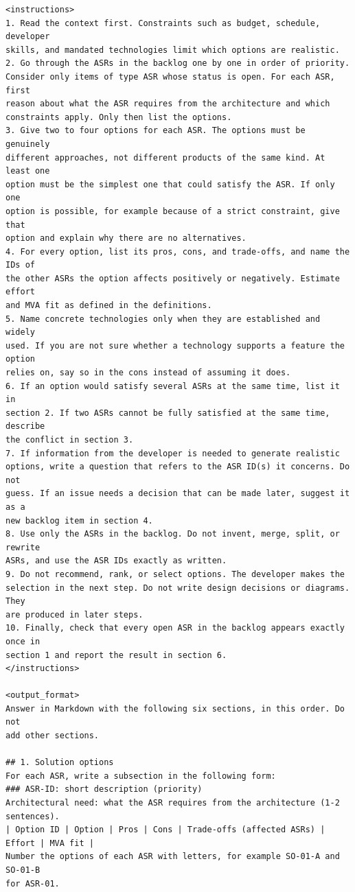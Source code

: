 \begin{lstlisting}
<instructions>
1. Read the context first. Constraints such as budget, schedule, developer
skills, and mandated technologies limit which options are realistic.
2. Go through the ASRs in the backlog one by one in order of priority.
Consider only items of type ASR whose status is open. For each ASR, first
reason about what the ASR requires from the architecture and which
constraints apply. Only then list the options.
3. Give two to four options for each ASR. The options must be genuinely
different approaches, not different products of the same kind. At least one
option must be the simplest one that could satisfy the ASR. If only one
option is possible, for example because of a strict constraint, give that
option and explain why there are no alternatives.
4. For every option, list its pros, cons, and trade-offs, and name the IDs of
the other ASRs the option affects positively or negatively. Estimate effort
and MVA fit as defined in the definitions.
5. Name concrete technologies only when they are established and widely
used. If you are not sure whether a technology supports a feature the option
relies on, say so in the cons instead of assuming it does.
6. If an option would satisfy several ASRs at the same time, list it in
section 2. If two ASRs cannot be fully satisfied at the same time, describe
the conflict in section 3.
7. If information from the developer is needed to generate realistic
options, write a question that refers to the ASR ID(s) it concerns. Do not
guess. If an issue needs a decision that can be made later, suggest it as a
new backlog item in section 4.
8. Use only the ASRs in the backlog. Do not invent, merge, split, or rewrite
ASRs, and use the ASR IDs exactly as written.
9. Do not recommend, rank, or select options. The developer makes the
selection in the next step. Do not write design decisions or diagrams. They
are produced in later steps.
10. Finally, check that every open ASR in the backlog appears exactly once in
section 1 and report the result in section 6.
</instructions>

<output_format>
Answer in Markdown with the following six sections, in this order. Do not
add other sections.

## 1. Solution options
For each ASR, write a subsection in the following form:
### ASR-ID: short description (priority)
Architectural need: what the ASR requires from the architecture (1-2
sentences).
| Option ID | Option | Pros | Cons | Trade-offs (affected ASRs) | Effort | MVA fit |
Number the options of each ASR with letters, for example SO-01-A and SO-01-B
for ASR-01.


\end{lstlisting}
